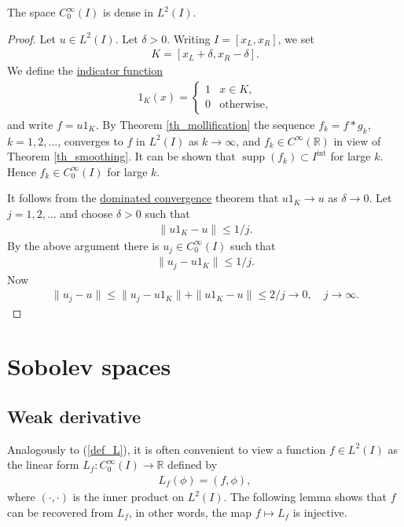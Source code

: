 \documentclass[12pt,oneside,final]{amsart}
\def\R{\mathbb R}
\DeclareMathOperator{\supp}{supp}
\def\inter{\mathrm{int}}
\begin{document}
\begin{corollary}[Density in $L^2$]\label{cor_density_L2}
The space $C_0^\infty(I)$ is dense in $L^2(I)$.
\end{corollary}
\begin{proof}
Let $u \in L^2(I)$.
Let $\delta > 0$. 
Writing $I = [x_L, x_R]$, we set 
    \begin{align*}
K = [x_L + \delta, x_R - \delta].
    \end{align*}
We define the \href{https://en.wikipedia.org/wiki/Indicator_function}{indicator function} 
    \begin{align*}
1_K(x) = 
\begin{cases}
1 & x \in K,
\\ 
0 & \text{otherwise},
\end{cases}
    \end{align*}
and write $f = u 1_K$.
By Theorem \ref{th_mollification} 
the sequence $f_k = f * g_k$, $k=1,2,\dots$,
converges to $f$ in $L^2(I)$ as $k \to \infty$,
and $f_k \in C^\infty(\R)$ in view of Theorem \ref{th_smoothing}.
It can be shown that $\supp(f_k) \subset I^\inter$ for large $k$. Hence $f_k \in C_0^\infty(I)$ for large $k$. 

It follows from the \href{https://en.wikipedia.org/wiki/Dominated_convergence_theorem}{dominated convergence} theorem
that $u1_K \to u$ as $\delta \to 0$.
Let $j = 1,2,\dots$ and choose $\delta > 0$ such that 
    \begin{align*}
\|u1_K - u\| \le 1/j.
    \end{align*} 
By the above argument there is $u_j \in C_0^\infty(I)$
such that 
    \begin{align*}
\|u_j - u1_K\| \le 1/j.
    \end{align*}
Now 
    \begin{align*}
\|u_j - u\| \le \|u_j - u1_K\| + \|u1_K - u\| \le 2/j \to 0,
\quad j \to \infty.
    \end{align*}
\end{proof}

\section{Sobolev spaces}

\subsection{Weak derivative}

Analogously to (\ref{def_L}), it is often convenient to view a function $f \in L^2(I)$ 
as the linear form $L_f : C_0^\infty(I) \to \R$ defined by 
    \begin{align*}
L_f(\phi) = (f, \phi),
    \end{align*}
where $(\cdot,\cdot)$ is the inner product on $L^2(I)$.
The following lemma shows that $f$ can be recovered from $L_f$, in other words, the map $f \mapsto L_f$ is injective. 
\end{document}
